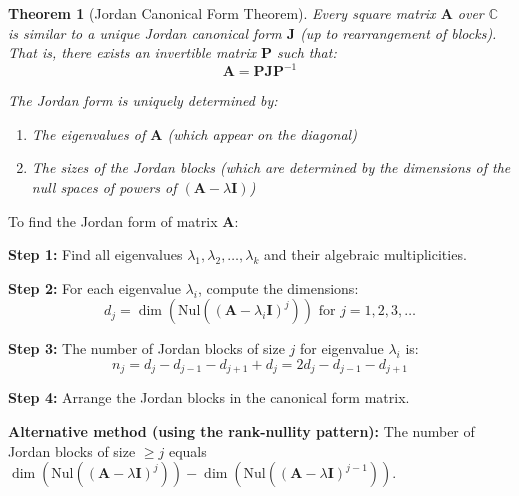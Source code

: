 \documentclass[12pt]{article}
\numberwithin{equation}{section}
\newcommand{\mat}[1]{\mathbf{#1}}        %
\theoremstyle{plain}
\newtheorem{theorem}{Theorem}[section]
\theoremstyle{definition}
\theoremstyle{remark}
\begin{document}
\begin{theorem}[Jordan Canonical Form Theorem]
Every square matrix $\mat{A}$ over $\mathbb{C}$ is similar to a unique Jordan canonical form $\mat{J}$ (up to rearrangement of blocks). That is, there exists an invertible matrix $\mat{P}$ such that:
$$\mat{A} = \mat{P}\mat{J}\mat{P}^{-1}$$

The Jordan form is uniquely determined by:
\begin{enumerate}
\item The eigenvalues of $\mat{A}$ (which appear on the diagonal)
\item The sizes of the Jordan blocks (which are determined by the dimensions of the null spaces of powers of $(\mat{A} - \lambda\mat{I})$)
\end{enumerate}
\end{theorem}

\begin{algorithm}[H]
\caption{Computing Jordan Canonical Form}
To find the Jordan form of matrix $\mat{A}$:

\textbf{Step 1:} Find all eigenvalues $\lambda_1, \lambda_2, \ldots, \lambda_k$ and their algebraic multiplicities.

\textbf{Step 2:} For each eigenvalue $\lambda_i$, compute the dimensions:
$$d_j = \dim(\text{Nul}((\mat{A} - \lambda_i\mat{I})^j)) \text{ for } j = 1, 2, 3, \ldots$$

\textbf{Step 3:} The number of Jordan blocks of size $j$ for eigenvalue $\lambda_i$ is:
$$n_j = d_j - d_{j-1} - d_{j+1} + d_j = 2d_j - d_{j-1} - d_{j+1}$$

\textbf{Step 4:} Arrange the Jordan blocks in the canonical form matrix.

\textbf{Alternative method (using the rank-nullity pattern):}
The number of Jordan blocks of size $\geq j$ equals $\dim(\text{Nul}((\mat{A} - \lambda\mat{I})^j)) - \dim(\text{Nul}((\mat{A} - \lambda\mat{I})^{j-1}))$.
\end{algorithm}
\end{document}

